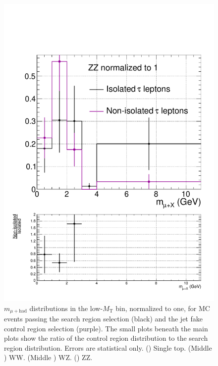 \begin{figure}[hbtp]
\begin{center}
    \includegraphics[width=0.6\cmsFigWidth]{figures/isoVsNonIsoTaus_ZZ_lowMT_v87}
    \caption{$m_{\mu+\text{had}}$ distributions in the low-$M_{\text{T}}$ bin, normalized to one, for MC events passing the search region selection (black) and the jet fake control region selection (purple).  The small plots beneath the main plots show the ratio of the control region distribution to the search region distribution.  Errors are statistical only.  (\cmsLeft) Single top.  (Middle \cmsLeft) WW.  (Middle \cmsRight) WZ.  (\cmsRight) ZZ.}
    \label{fig:MC-regA-vs-regB-secondary-lowMT}
  \end{center}
\end{figure}

